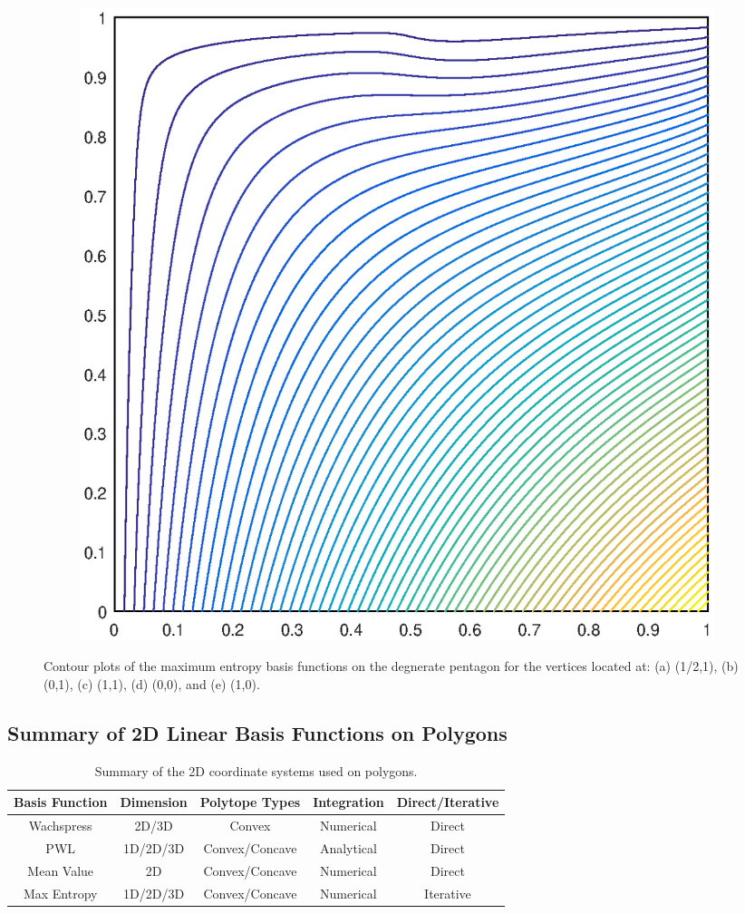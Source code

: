 \begin{figure}
\begin{subfigure}[b]{0.35\textwidth}
		\caption{}
	\end{subfigure}
	\hspace{1cm}
	\begin{subfigure}[b]{0.35\textwidth}
		\centering
		\includegraphics[width=\textwidth]{figures/sec_BF/deg_square_MAXENT1_contour_b2.eps}
		\caption{}
	\end{subfigure}
\caption{Contour plots of the maximum entropy basis functions on the degnerate pentagon for the vertices located at: (a) (1/2,1), (b) (0,1), (c) (1,1), (d) (0,0), and (e) (1,0).}
\end{figure}

\subsection{Summary of 2D Linear Basis Functions on Polygons}
\label{sec::BF_2DLinear_Summary}

\begin{table}
\caption[Summary of the 2D polygonal basis functions]{Summary of the 2D coordinate systems used on polygons. }
\begin{tabular}{|c|c|c|c|c|}
\hline
Basis Function & Dimension & Polytope Types & Integration & Direct/Iterative \\
\hline \hline
Wachspress	&2D/3D&	Convex&	Numerical	&Direct\\ \hline
PWL&	1D/2D/3D&	Convex/Concave&	Analytical	&Direct\\ \hline
Mean Value&	2D&	Convex/Concave&	Numerical	&Direct\\ \hline
Max Entropy&	1D/2D/3D	&Convex/Concave&	Numerical&	Iterative\\ \hline
\end{tabular}
\end{table}

